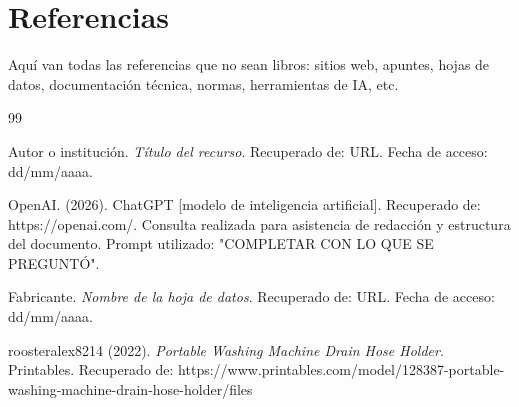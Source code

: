 \chapter*{Referencias}

Aquí van todas las referencias que no sean libros: sitios web, apuntes, hojas de datos, documentación técnica, normas, herramientas de IA, etc.

\begin{thebibliography}{99}

 Autor o institución. \textit{Título del recurso}. Recuperado de: URL. Fecha de acceso: dd/mm/aaaa.

 OpenAI. (2026). ChatGPT \textnormal{[modelo de inteligencia artificial]. Recuperado de: https://openai.com/. Consulta realizada para asistencia de redacción y estructura del documento. Prompt utilizado: "COMPLETAR CON LO QUE SE PREGUNTÓ".}

 Fabricante. \textit{Nombre de la hoja de datos}. Recuperado de: URL. Fecha de acceso: dd/mm/aaaa.

 roosteralex8214 (2022). \textit{Portable Washing Machine Drain Hose Holder}. Printables. Recuperado de: https://www.printables.com/model/128387-portable-washing-machine-drain-hose-holder/files

\end{thebibliography}